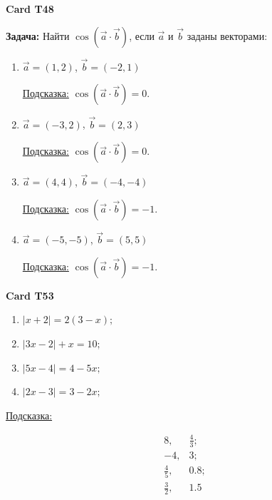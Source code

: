 \documentclass[12pt,a4paper]{article}
\begin{document}
\bigskip
{}
\noindent\textbf{Card T48}
\medskip  
{}

\textbf{Задача:} Найти \(\cos(\vec{a} \cdot \vec{b})\), если \(\vec{a}\) и \(\vec{b}\) заданы векторами:
\begin{enumerate}
	\item \(\vec{a} = (1, 2)\), \(\vec{b} = (-2, 1)\)
		
	\medskip
	\noindent \underline{Подсказка:}
$	\cos(\vec{a} \cdot \vec{b}) = 0$.

	\item \(\vec{a} = (-3, 2)\), \(\vec{b} = (2, 3)\)
		
	\medskip
	\noindent \underline{Подсказка:}
$	\cos(\vec{a} \cdot \vec{b}) = 0$.

	\item \(\vec{a} = (4, 4)\), \(\vec{b} = (-4, -4)\)
		
	\medskip
	\noindent \underline{Подсказка:}
$	\cos(\vec{a} \cdot \vec{b}) = -1$.

	\item \(\vec{a} = (-5, -5)\), \(\vec{b} = (5, 5)\)
		
	\medskip
	\noindent \underline{Подсказка:}
$	\cos(\vec{a} \cdot \vec{b}) = -1$.
\end{enumerate}

\bigskip
{}
\noindent\textbf{Card T53}
\medskip  
{} 
\begin{enumerate}
	\item \( |x + 2| = 2(3 - x); \)
	\item \( |3x - 2| + x = 10; \)
	\item \( |5x - 4| = 4 - 5x; \)
	\item \( |2x - 3| = 3 - 2x; \)
\end{enumerate}

\medskip
\noindent \underline{Подсказка:}

\[
\begin{array}{ll}
	8, & \frac{4}{3}; \\
	-4, & 3; \\
	\frac{4}{5}, & 0.8; \\
	\frac{3}{2}, & 1.5
\end{array}
\]
\end{document}
